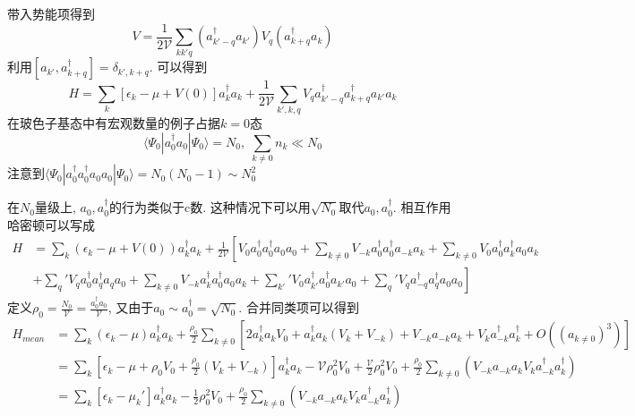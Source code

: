 \documentclass[a4paper,11pt]{article}
\begin{document}
带入势能项得到
\begin{equation*}
  V=\frac{1}{2\mathcal{V}}\sum_{kk'q}(a_{k'-q}^\dag a_{k'})V_q(a_{k+q}^\dag a_k)
\end{equation*}
利用$[a_{k'},a_{k+q}^\dag]=\delta_{k',k+q}$. 可以得到
\begin{equation*}
  H=\sum_{k}[\epsilon_k-\mu+V(0)]a_k^\dag a_k+\frac{1}{2\mathcal{V}}\sum_{k',k,q}V_{q}a_{k'-q}^\dag a_{k+q}^\dag a_{k'}a_{k}
\end{equation*}
在玻色子基态中有宏观数量的例子占据$k=0$态
\begin{equation*}
  \langle\Psi_0|a_0^\dag a_0|\Psi_0\rangle=N_0,\;\sum_{k\neq0}n_k\ll N_0
\end{equation*}
注意到$\langle\Psi_0|a_0^\dag a_0^\dag a_0 a_0|\Psi_0\rangle=N_0(N_0-1)\sim N_0^2$

在$N_0$量级上, $a_0,a_0^\dag$的行为类似于c数. 这种情况下可以用$\sqrt{N_0}$取代$a_0,a_0^\dag$. 相互作用哈密顿可以写成
\begin{equation*}
  \begin{split}
     H&=\sum_{k}(\epsilon_k-\mu+V(0))a_k^\dag a_k+\frac{1}{2\mathcal{V}}\left[V_0a_0^\dag a_0^\dag a_0 a_0+\sum_{k\neq0}V_{-k}a_0^\dag a_0^\dag a_{-k}a_k+\sum_{k\neq0}V_0a_0^\dag a_k^\dag a_0 a_k\right.\\
     &\left.+\sum_{q}'V_q a_0^\dag a_q^\dag a_q a_0+\sum_{k\neq0} V_{-k}a_k^\dag a_0^\dag a_0 a_k+\sum_{k'}'V_0 a_{k'}^\dag a_0^\dag a_{k'}a_0+\sum_{q}'V_{q}a_{-q}^\dag a_q^\dag a_0 a_0\right]
  \end{split}
\end{equation*}
定义$\rho_0=\frac{N_0}{\mathcal{V}}=\frac{a_0^\dag a_0}{\mathcal{V}}$, 又由于$a_0\sim a_0^\dag=\sqrt{N_0}$. 合并同类项可以得到
\begin{equation*}
  \begin{split}
     H_{mean}&=\sum_{k}(\epsilon_k-\mu)a_k^\dag a_k+\frac{\rho_0}{2}\sum_{k\neq0}\left[2a_k^\dag a_k V_0+a_k^\dag a_k(V_k+V_{-k})+V_{-k}a_{-k}a_k+V_{k}a_{-k}^\dag a_k^\dag+O((a_{k\neq 0})^3)\right] \\
       &=\sum_{k}[\epsilon_k-\mu+\rho_0V_0+\frac{\rho_0}{2}(V_k+V_{-k})]a_k^\dag a_k-\mathcal{V}\rho_0^2V_0+\frac{\mathcal{V}}{2}\rho_0^2V_0+\frac{\rho_0}{2}\sum_{k\neq0}(V_{-k}a_{-k}a_{k}V_{k}a_{-k}^\dag a_{k}^\dag)\\
       &=\sum_{k}[\epsilon_k-\mu_{k}']a_k^\dag a_k-\frac{1}{2}\rho_0^2V_0+\frac{\rho_0}{2}\sum_{k\neq0}(V_{-k}a_{-k}a_{k}V_{k}a_{-k}^\dag a_{k}^\dag)
  \end{split}
\end{equation*}
\end{document}

